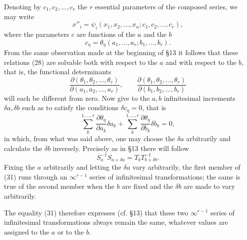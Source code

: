 \documentclass[11pt]{book}
\begin{document}
Denoting by $c_1,c_2,\ldots,c_r$ the $r$ essential parameters of the composed series, we may write
\begin{equation*}\tag{28}
 x''_i=\psi_i(x_1,x_2,\ldots,x_n;c_1,c_2,\ldots,c_r),
\end{equation*}
where the parameters $c$ are functions of the $a$ and the $b$
\begin{equation*}\tag{29}
 c_\eta=\theta_\eta(a_1,\ldots,a_r;b_1,\ldots,b_r).
\end{equation*}
From the same observation made at the beginning of \S{}13 it follows that these relations (28) are solvable both with respect to the $a$ and with respect to the $b$, that is, the functional determinants
\[
 \frac{\partial(\theta_1,\theta_2,\ldots,\theta_r)}{\partial(a_1,a_2,\ldots,a_r)},
 \qquad
 \frac{\partial(\theta_1,\theta_2,\ldots,\theta_r)}{\partial(b_1,b_2,\ldots,b_r)}
\]
will each be different from zero. Now give to the $a,b$ infinitesimal increments $\delta a,\delta b$ such as to satisfy the conditions $\delta c_\eta=0$, that is
\begin{equation*}\tag{30}
 \sum\limits_k^{1,\ldots,r}\frac{\partial\theta_\eta}{\partial a_k}\delta a_k
 +\sum\limits_k^{1,\ldots,r}\frac{\partial\theta_\eta}{\partial b_k}\delta b_k=0,
\end{equation*}
in which, from what was said above, one may choose the $\delta a$ arbitrarily and calculate the $\delta b$ inversely. Precisely as in \S{}13 there will follow
\begin{equation*}\tag{31}
 S_a^{-1}S_{a+\delta a}=T_bT_{b+\delta b}^{-1}.
\end{equation*}
Fixing the $a$ arbitrarily and letting the $\delta a$ vary arbitrarily, the first member of (31) runs through an $\infty^{r-1}$ series of infinitesimal transformations; the same is true of the second member when the $b$ are fixed and the $\delta b$ are made to vary arbitrarily.

The equality (31) therefore expresses (cf. \S{}13) that these two $\infty^{r-1}$ series of infinitesimal transformations always remain the same, whatever values are assigned to the $a$ or to the $b$.
\end{document}
